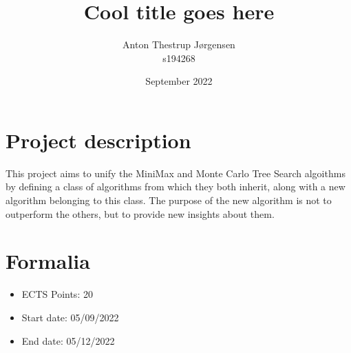 \documentclass{article}
\title{Cool title goes here}
\author{Anton Thestrup Jørgensen \\ s194268}
\date{September 2022}
\begin{document}
\maketitle

\section*{Project description}

This project aims to unify the MiniMax and Monte Carlo Tree Search
algoithms by defining a class of algorithms from which they both 
inherit, along with a new algorithm belonging to this class. The
purpose of the new algorithm is not to outperform the others,
but to provide new insights about them.

\section*{Formalia}

\begin{itemize}
    \item ECTS Points: 20
    \item Start date: 05/09/2022
    \item End date: 05/12/2022
\end{itemize}
\end{document}
